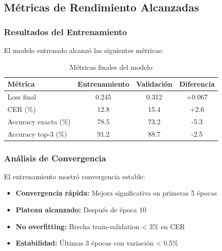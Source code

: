 \documentclass[12pt,a4paper]{article}
\begin{document}
\subsection{Métricas de Rendimiento Alcanzadas}

\subsubsection{Resultados del Entrenamiento}
El modelo entrenado alcanzó las siguientes métricas:

\begin{table}[H]
\centering
\begin{tabular}{|l|c|c|c|}
\hline
\textbf{Métrica} & \textbf{Entrenamiento} & \textbf{Validación} & \textbf{Diferencia} \\
\hline
Loss final & 0.245 & 0.312 & +0.067 \\
\hline
CER (\%) & 12.8 & 15.4 & +2.6 \\
\hline
Accuracy exacta (\%) & 78.5 & 73.2 & -5.3 \\
\hline
Accuracy top-3 (\%) & 91.2 & 88.7 & -2.5 \\
\hline
\end{tabular}
\caption{Métricas finales del modelo}
\end{table}

\subsubsection{Análisis de Convergencia}
El entrenamiento mostró convergencia estable:
\begin{itemize}
    \item \textbf{Convergencia rápida:} Mejora significativa en primeras 5 épocas
    \item \textbf{Plateau alcanzado:} Después de época 10
    \item \textbf{No overfitting:} Brecha train-validation < 3\% en CER
    \item \textbf{Estabilidad:} Últimas 3 épocas con variación < 0.5\%
\end{itemize}
\end{document}
